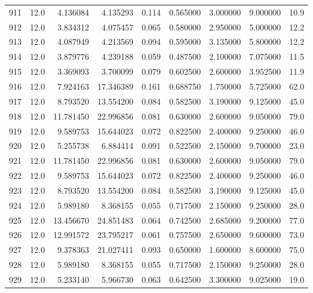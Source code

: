 \begin{tabular}{lrrrrrrrr}
911  &   12.0 &   4.136084 &   4.135293 &  0.114 &  0.565000 &  3.000000 &   9.000000 &   10.9 \\
912  &   12.0 &   3.834312 &   4.075457 &  0.065 &  0.580000 &  2.950000 &   5.000000 &   12.2 \\
913  &   12.0 &   4.087949 &   4.213569 &  0.094 &  0.595000 &  3.135000 &   5.800000 &   12.2 \\
914  &   12.0 &   3.879776 &   4.239188 &  0.059 &  0.487500 &  2.100000 &   7.075000 &   11.5 \\
915  &   12.0 &   3.369093 &   3.700099 &  0.079 &  0.602500 &  2.600000 &   3.952500 &   11.9 \\
916  &   12.0 &   7.924163 &  17.346389 &  0.161 &  0.688750 &  1.750000 &   5.725000 &   62.0 \\
917  &   12.0 &   8.793520 &  13.554200 &  0.084 &  0.582500 &  3.190000 &   9.125000 &   45.0 \\
918  &   12.0 &  11.781450 &  22.996856 &  0.081 &  0.630000 &  2.600000 &   9.050000 &   79.0 \\
919  &   12.0 &   9.589753 &  15.644023 &  0.072 &  0.822500 &  2.400000 &   9.250000 &   46.0 \\
920  &   12.0 &   5.255738 &   6.884414 &  0.091 &  0.522500 &  2.150000 &   9.700000 &   23.0 \\
921  &   12.0 &  11.781450 &  22.996856 &  0.081 &  0.630000 &  2.600000 &   9.050000 &   79.0 \\
922  &   12.0 &   9.589753 &  15.644023 &  0.072 &  0.822500 &  2.400000 &   9.250000 &   46.0 \\
923  &   12.0 &   8.793520 &  13.554200 &  0.084 &  0.582500 &  3.190000 &   9.125000 &   45.0 \\
924  &   12.0 &   5.989180 &   8.368155 &  0.055 &  0.717500 &  2.150000 &   9.250000 &   28.0 \\
925  &   12.0 &  13.456670 &  24.851483 &  0.064 &  0.742500 &  2.685000 &   9.200000 &   77.0 \\
926  &   12.0 &  12.991572 &  23.795217 &  0.061 &  0.757500 &  2.650000 &   9.600000 &   73.0 \\
927  &   12.0 &   9.378363 &  21.027411 &  0.093 &  0.650000 &  1.600000 &   8.600000 &   75.0 \\
928  &   12.0 &   5.989180 &   8.368155 &  0.055 &  0.717500 &  2.150000 &   9.250000 &   28.0 \\
929  &   12.0 &   5.233140 &   5.966730 &  0.063 &  0.642500 &  3.300000 &   9.025000 &   19.0 \\

\end{tabular}
